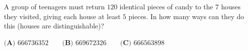 A group of teenagers must return $120$ identical pieces of candy to the $7$ houses they visited, giving each house at least $5$ pieces. In how many ways can they do this (houses are distinguishable)?

$\textbf{(A) }666736352\qquad\textbf{(B) }669672326\qquad\textbf{(C) }666563898$
